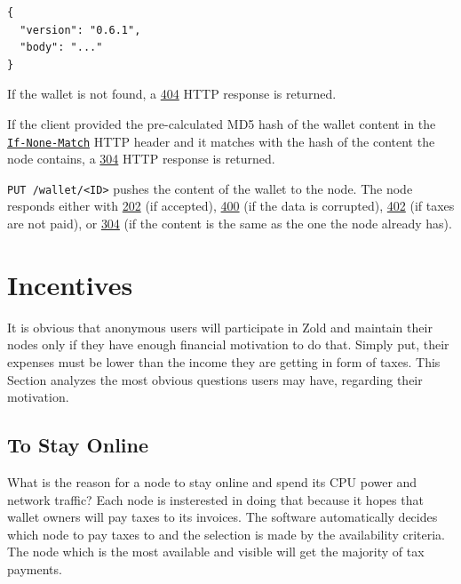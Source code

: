 \documentclass[11pt,oneside]{article}
\newcommand\dd[1]{\colorbox{gray!30}{\texttt{#1}}}
\begin{document}
\begin{verbatim}
{
  "version": "0.6.1",
  "body": "..."
}\end{verbatim}

If the wallet is not found, a
\href{https://www.w3.org/Protocols/rfc2616/rfc2616-sec10.html#sec10.4.5}{404}
HTTP response is returned.

If the client provided the pre-calculated MD5 hash of the wallet content in the
\href{https://www.w3.org/Protocols/rfc2616/rfc2616-sec14.html#sec14.26}{\dd{If-None-Match}}
HTTP header and it matches with the hash of the
content the node contains, a
\href{https://www.w3.org/Protocols/rfc2616/rfc2616-sec10.html#sec10.3.5}{304} HTTP response is returned.

\dd{PUT /wallet/<ID>} pushes the content of the wallet to the node. The
node responds either with
\href{https://www.w3.org/Protocols/rfc2616/rfc2616-sec10.html#sec10.2.3}{202} (if accepted),
\href{https://www.w3.org/Protocols/rfc2616/rfc2616-sec10.html#sec10.4.1}{400} (if the data is corrupted),
\href{https://www.w3.org/Protocols/rfc2616/rfc2616-sec10.html#sec10.4.3}{402} (if taxes are not paid),
or
\href{https://www.w3.org/Protocols/rfc2616/rfc2616-sec10.html#sec10.3.5}{304}
(if the content is the same as the one the node already has).

\section{Incentives}

It is obvious that anonymous users will participate in Zold and maintain
their nodes only if they have enough financial motivation to do that. Simply
put, their expenses must be lower than the income they are getting in
form of taxes. This Section analyzes the most obvious questions users
may have, regarding their motivation.

\subsection{To Stay Online}

What is the reason for a node to stay online and spend its CPU power
and network traffic? Each node is insterested in doing that because it
hopes that wallet owners will pay taxes to its invoices. The software
automatically decides which node to pay taxes to and the selection is
made by the availability criteria. The node which is the most available
and visible will get the majority of tax payments.
\end{document}
